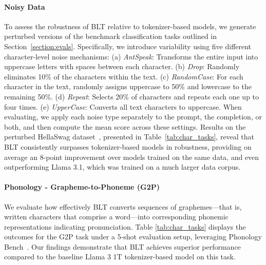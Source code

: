 \paragraph{Noisy Data} To assess the robustness of {\textsc BLT} relative to tokenizer-based models, we generate perturbed versions of the benchmark classification tasks outlined in Section~\ref{section:evals}. Specifically, we introduce variability using five different character-level noise mechanisms: (a) \textit{AntSpeak}: Transforms the entire input into uppercase letters with spaces between each character. (b) \textit{Drop}: Randomly eliminates 10\% of the characters within the text. (c) \textit{RandomCase}: For each character in the text, randomly assigns uppercase to 50\% and lowercase to the remaining 50\%. (d) \textit{Repeat}: Selects 20\% of characters and repeats each one up to four times. (e) \textit{UpperCase}: Converts all text characters to uppercase. When evaluating, we apply each noise type separately to the prompt, the completion, or both, and then compute the mean score across these settings. Results on the perturbed HellaSwag dataset~\citep{Eval_hellaswag}, presented in Table~\ref{tab:char_tasks}, reveal that {\textsc BLT} consistently surpasses tokenizer-based models in robustness, providing on average an 8-point improvement over models trained on the same data, and even outperforming Llama 3.1, which was trained on a much larger data corpus.

\paragraph{Phonology - Grapheme-to-Phoneme (G2P)} We evaluate how effectively {\textsc BLT} converts sequences of graphemes—that is, written characters that comprise a word—into corresponding phonemic representations indicating pronunciation. Table \ref{tab:char_tasks} displays the outcomes for the G2P task under a 5-shot evaluation setup, leveraging Phonology Bench~\citep{suvarna2024phonologybench}. Our findings demonstrate that {\textsc BLT} achieves superior performance compared to the baseline Llama 3 1T tokenizer-based model on this task.

